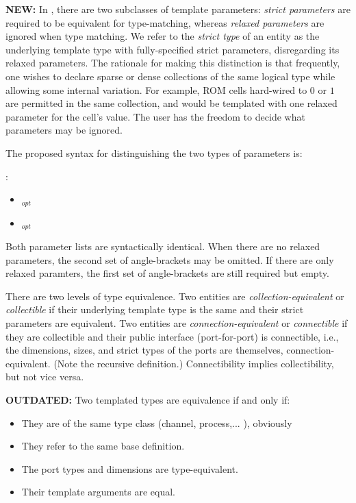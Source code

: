 \textbf{NEW:}
In \artxx, there are two subclasses of template parameters:
\emph{strict parameters} are required to be equivalent for type-matching,
whereas \emph{relaxed parameters} are ignored when type matching.  
We refer to the \emph{strict type} of an entity as the 
underlying template type with fully-specified strict parameters, 
disregarding its relaxed parameters.  
The rationale for making this distinction is that frequently, 
one wishes to declare sparse or dense collections of the same 
logical type while allowing some internal variation.  
For example, ROM cells hard-wired to $0$ or $1$ are permitted
in the same collection, and would be templated with one relaxed 
parameter for the cell's value.  
The user has the freedom to decide what parameters may be ignored.  

The proposed syntax for distinguishing the two types of parameters is:

\medskip
\noindent
{}:
\begin{itemize}
\item {} \ttt{<} $_{opt}$ \ttt{>}
\item {} \ttt{<} $_{opt}$ \ttt{>}
	\ttt{<}  \ttt{>}
\end{itemize}
Both parameter lists are syntactically identical.  
When there are no relaxed parameters, the second set of angle-brackets
may be omitted.  
If there are only relaxed paramters, the first set of angle-brackets
are still required but empty.  


There are two levels of type equivalence.  
Two entities are \emph{collection-equivalent} or \emph{collectible}
if their underlying template type is the same and their 
strict parameters are equivalent.  
Two entities are \emph{connection-equivalent} or \emph{connectible}
if they are collectible and their public interface 
(port-for-port) is connectible, i.e., 
the dimensions, sizes, and strict types of the ports are themselves, 
connection-equivalent.  
(Note the recursive definition.)
Connectibility implies collectibility, but not vice versa.  


\textbf{OUTDATED:}
Two templated types are equivalence if and only if:
\begin{itemize}
\item They are of the same type class (channel, process,... ), obviously
\item They refer to the same base definition.  
\item The port types and dimensions are type-equivalent.  
\item Their template arguments are equal.  
\end{itemize}

